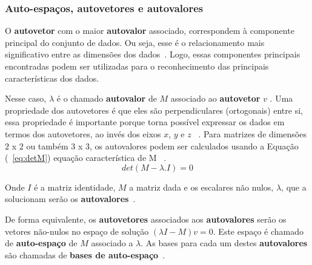 %
%


\subsubsection{Auto-espaços, autovetores e autovalores} \label{section:autoespaço}
O \textbf{autovetor} com o maior \textbf{autovalor} associado, correspondem à componente principal do conjunto de dados. Ou seja, esse é o relacionamento mais significativo entre as dimensões dos dados~\cite{smith2002}. Logo, essas componentes principais encontradas podem ser utilizadas para o reconhecimento das principais características dos dados.


Nesse caso, $\lambda$ é o chamado \textbf{autovalor} de $M$ associado ao \textbf{autovetor} $v$ . Uma propriedade dos autovetores é que eles são perpendiculares (ortogonais) entre si, essa propriedade é importante porque torna possível expressar os dados em termos dos autovetores, ao invés dos eixos $x$, $y$ e $z$ ~\cite{aura2007}. 
Para matrizes de dimensões $2$ x $2$  ou também $3$ x $3$, os autovalores podem ser calculados usando a Equação (~\ref{eq:detM}) equação característica de M ~\cite{aura2007}.
\linebreak
\begin{equation}
	det(M - \lambda.I) = 0
\label{eq:detM}
\end{equation}

Onde $I$ é a matriz identidade, $M$ a matriz dada e os escalares não nulos, $\lambda$, que a solucionam serão os \textbf{autovalores}~\cite{aura2007}. 

De forma equivalente, os \textbf{autovetores} associados aos \textbf{autovalores} serão os vetores não-nulos no espaço de solução $( \lambda I - M) v = 0$. Este espaço é chamado de \textbf{auto-espaço} de $M$ associado a $\lambda$. As bases para cada um destes \textbf{autovalores} são chamadas de \textbf{bases de auto-espaço}~\cite{aura2007}.


